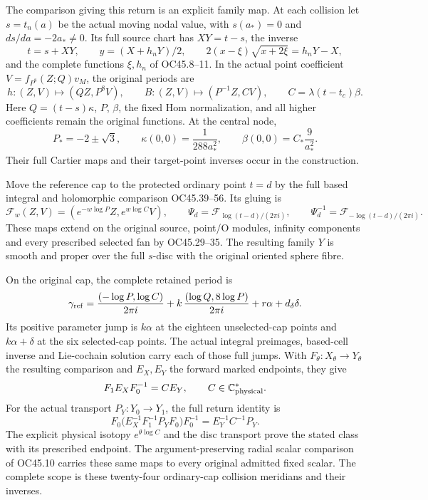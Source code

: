 \begin{theorem}
The comparison giving this return is an explicit family map.
At each collision let \(s=t_n(a)\) be the actual moving nodal
value, with \(s(a_*)=0\) and \(ds/da=-2a_*\ne0\). Its full
source chart has \(XY=t-s\), the inverse
\[
t=s+XY,\qquad y=(X+h_nY)/2,\qquad
2(x-\xi)\sqrt{x+2\xi}=h_nY-X,
\]
and the complete functions \(\xi,h_n\) of OC45.8--11.
In the actual point coefficient \(V=f_{P^8}(Z;Q)v_M\), the
original periods are
\[
h:(Z,V)\longmapsto(QZ,P^8V),\qquad
B:(Z,V)\longmapsto(P^{-1}Z,CV),\qquad
C=\lambda(t-t_c)\beta .
\]
Here \(Q=(t-s)\kappa\), \(P\), \(\beta\), the fixed Hom
normalization, and all higher coefficients remain the original
functions. At the central node,
\[
P_*=-2\pm\sqrt3,\qquad
\kappa(0,0)=\frac1{288a_*^2},\qquad
\beta(0,0)=C_*\frac9{a_*^2}.
\]
Their full Cartier maps and their target-point inverses occur in
the construction.

Move the reference cap to the protected ordinary point \(t=d\)
by the full based integral and holomorphic comparison
OC45.39--56. Its gluing is
\[
\mathcal F_w(Z,V)=(e^{-w\log P}Z,e^{w\log C}V),\qquad
\Psi_d=\mathcal F_{\log(t-d)/(2\pi i)},\qquad
\Psi_d^{-1}=\mathcal F_{-\log(t-d)/(2\pi i)}.
\]
These maps extend on the original source, point/O modules,
infinity components and every prescribed selected fan by
OC45.29--35. The resulting family \(Y\) is smooth and proper
over the full \(s\)-disc with the original oriented sphere fibre.

On the original cap, the complete retained period is
\[
\gamma_{\rm ref}
=\frac{(-\log P,\log C)}{2\pi i}
+k\,\frac{(\log Q,8\log P)}{2\pi i}
+r\alpha+d_\delta\delta .
\]
Its positive parameter jump is \(k\alpha\) at the eighteen
unselected-cap points and \(k\alpha+\delta\) at the six
selected-cap points. The actual integral preimages, based-cell
inverse and Lie-cochain solution carry each of those full jumps.
With \(F_\theta:X_\theta\to Y_\theta\) the resulting comparison
and \(E_X,E_Y\) the forward marked endpoints, they give
\[
F_1E_XF_0^{-1}=CE_Y,\qquad
C\in\mathbb C^*_{\rm physical}.
\]
For the actual transport \(P_Y:Y_0\to Y_1\), the full return
identity is
\[
F_0\bigl(E_X^{-1}F_1^{-1}P_YF_0\bigr)F_0^{-1}
=E_Y^{-1}C^{-1}P_Y .
\]
The explicit physical isotopy \(e^{\theta\log C}\) and the
disc transport prove the stated class with its prescribed
endpoint. The argument-preserving radial scalar comparison
of OC45.10 carries these same maps to every original admitted
fixed scalar. The complete scope is these twenty-four
ordinary-cap collision meridians and their inverses.
\end{theorem}
